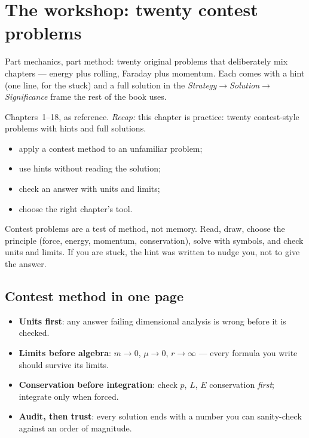 \chapter{The workshop: twenty contest problems}\label{ch:workshop}

Part mechanics, part method: twenty original problems that deliberately
mix chapters --- energy plus rolling, Faraday plus momentum. Each comes
with a hint (one line, for the stuck) and a full solution in the
\emph{Strategy}$\to$\emph{Solution}$\to$\emph{Significance} frame the
rest of the book uses.

\begin{rulebox}
Chapters~1--18, as reference. \emph{Recap:} this chapter is practice: twenty contest-style problems with hints and full solutions.
\end{rulebox}
\begin{wins}
\begin{itemize}
\item apply a contest method to an unfamiliar problem;
\item use hints without reading the solution;
\item check an answer with units and limits;
\item choose the right chapter's tool.
\end{itemize}
\end{wins}
\begin{principle}
Contest problems are a test of method, not memory. Read, draw, choose the principle (force, energy, momentum, conservation), solve with symbols, and check units and limits. If you are stuck, the hint was written to nudge you, not to give the answer.
\end{principle}

\section{Contest method in one page}\label{sec:ws-method}

\begin{itemize}
\item \textbf{Units first}: any answer failing dimensional analysis is
wrong before it is checked.
\item \textbf{Limits before algebra}: $m\to0$, $\mu\to0$, $r\to\infty$
--- every formula you write should survive its limits.
\item \textbf{Conservation before integration}: check $p$, $L$, $E$
conservation \emph{first}; integrate only when forced.
\item \textbf{Audit, then trust}: every solution ends with a number you
can sanity-check against an order of magnitude.
\end{itemize}

